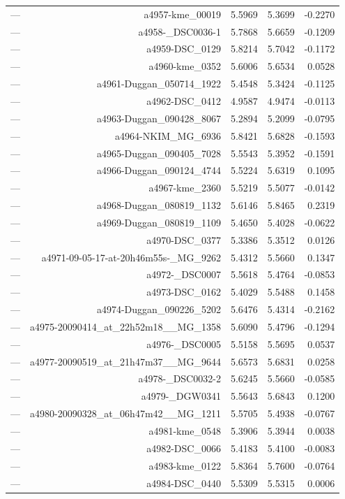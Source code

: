 \begin{table}[htbp]
\begin{tabular}{lrrrr}
— & a4957-kme_00019 & 5.5969 & 5.3699 & -0.2270 \\
— & a4958-_DSC0036-1 & 5.7868 & 5.6659 & -0.1209 \\
— & a4959-DSC_0129 & 5.8214 & 5.7042 & -0.1172 \\
— & a4960-kme_0352 & 5.6006 & 5.6534 & 0.0528 \\
— & a4961-Duggan_050714_1922 & 5.4548 & 5.3424 & -0.1125 \\
— & a4962-DSC_0412 & 4.9587 & 4.9474 & -0.0113 \\
— & a4963-Duggan_090428_8067 & 5.2894 & 5.2099 & -0.0795 \\
— & a4964-NKIM_MG_6936 & 5.8421 & 5.6828 & -0.1593 \\
— & a4965-Duggan_090405_7028 & 5.5543 & 5.3952 & -0.1591 \\
— & a4966-Duggan_090124_4744 & 5.5224 & 5.6319 & 0.1095 \\
— & a4967-kme_2360 & 5.5219 & 5.5077 & -0.0142 \\
— & a4968-Duggan_080819_1132 & 5.6146 & 5.8465 & 0.2319 \\
— & a4969-Duggan_080819_1109 & 5.4650 & 5.4028 & -0.0622 \\
— & a4970-DSC_0377 & 5.3386 & 5.3512 & 0.0126 \\
— & a4971-09-05-17-at-20h46m55s-_MG_9262 & 5.4312 & 5.5660 & 0.1347 \\
— & a4972-_DSC0007 & 5.5618 & 5.4764 & -0.0853 \\
— & a4973-DSC_0162 & 5.4029 & 5.5488 & 0.1458 \\
— & a4974-Duggan_090226_5202 & 5.6476 & 5.4314 & -0.2162 \\
— & a4975-20090414_at_22h52m18__MG_1358 & 5.6090 & 5.4796 & -0.1294 \\
— & a4976-_DSC0005 & 5.5158 & 5.5695 & 0.0537 \\
— & a4977-20090519_at_21h47m37__MG_9644 & 5.6573 & 5.6831 & 0.0258 \\
— & a4978-_DSC0032-2 & 5.6245 & 5.5660 & -0.0585 \\
— & a4979-_DGW0341 & 5.5643 & 5.6843 & 0.1200 \\
— & a4980-20090328_at_06h47m42__MG_1211 & 5.5705 & 5.4938 & -0.0767 \\
— & a4981-kme_0548 & 5.3906 & 5.3944 & 0.0038 \\
— & a4982-DSC_0066 & 5.4183 & 5.4100 & -0.0083 \\
— & a4983-kme_0122 & 5.8364 & 5.7600 & -0.0764 \\
— & a4984-DSC_0440 & 5.5309 & 5.5315 & 0.0006 \\

\end{tabular}
\end{table}
